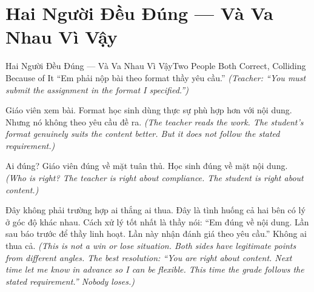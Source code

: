 \section{Hai Người Đều Đúng --- Và Va Nhau Vì Vậy}
\begin{truyen}{Hai Người Đều Đúng --- Và Va Nhau Vì Vậy}{Two People Both Correct, Colliding Because of It}
 ``Em phải nộp bài theo format thầy yêu cầu.''
\textit{(Teacher: ``You must submit the assignment in the format I specified.'')}


Giáo viên xem bài. Format học sinh dùng thực sự phù hợp hơn với nội dung. Nhưng nó không theo yêu cầu đề ra.
\textit{(The teacher reads the work. The student's format genuinely suits the content better. But it does not follow the stated requirement.)}

Ai đúng? Giáo viên đúng về mặt tuân thủ. Học sinh đúng về mặt nội dung.
\textit{(Who is right? The teacher is right about compliance. The student is right about content.)}

\begin{baihoc}
Đây không phải trường hợp ai thắng ai thua. Đây là tình huống cả hai bên có lý ở góc độ khác nhau. Cách xử lý tốt nhất là thầy nói: ``Em đúng về nội dung. Lần sau báo trước để thầy linh hoạt. Lần này nhận đánh giá theo yêu cầu.'' Không ai thua cả.
\textit{(This is not a win or lose situation. Both sides have legitimate points from different angles. The best resolution: ``You are right about content. Next time let me know in advance so I can be flexible. This time the grade follows the stated requirement.'' Nobody loses.)}
\end{baihoc}
\end{truyen}

